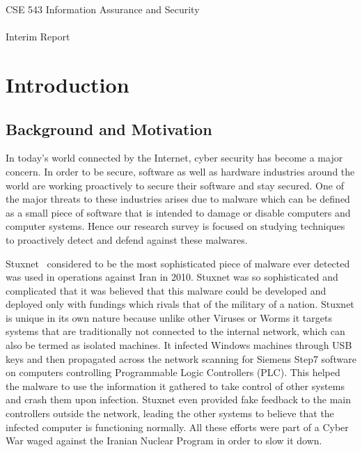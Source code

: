 \documentclass[11pt]{article}
\title{\fulltitle}
\author{Tejas Khairnar (1207690220, Group Leader) \\Sujay Vaishampayan (1209248166, Deputy Group Leader)\\  Zhibo Sun(1207644187)\\Harshil Maskai (1209174092)\\ Aloma Lopes (1209273126)\\ Chaitanya Palaka (1209261868)\\ Varun Chandrasekar (1209248010) \\ Kunal Bansal (1211213169) \\ Raj Dalvi (1209232176) \\ Vimal Vadivelu (1209203043)\\ \\
		Arizona State University}
\begin{document}
	\begingroup
		\fontsize{15pt}{15pt}\selectfont
		\begin{center}
			CSE 543 Information Assurance and Security \\~\\
			Interim Report
		\end{center}
	\endgroup
	\tableofcontents
	
	\section{Introduction}
	\subsection{Background and Motivation}
	In today’s world connected by the Internet, cyber security has become a major concern. In order
to be secure, software as well as hardware industries around the world are working proactively to
secure their software and stay secured. One of the major threats to these industries arises due to
malware which can be defined as a small piece of software that is intended to damage or disable
computers and computer systems. Hence our research survey is focused on studying techniques
to proactively detect and defend against these malwares.

Stuxnet~\cite{creators2013kill, stuxnet} considered to be the most sophisticated piece of malware ever detected was used in operations against Iran in 2010. Stuxnet was so sophisticated and complicated that it was believed that this malware could be developed and deployed only with fundings which rivals that of the military of a nation. Stuxnet is unique in its own nature because unlike other Viruses or Worms it targets systems that are traditionally not connected to the internal network, which can also be termed as isolated machines. It infected Windows machines through USB keys and then propagated across the network scanning for Siemens Step7 software on computers controlling Programmable Logic Controllers (PLC). This helped the malware to use the information it gathered to take control of other systems and crash them upon infection. Stuxnet even provided fake feedback to the main controllers outside the network, leading the other systems to believe that the infected computer is functioning normally. All these efforts were part of a Cyber War waged against the Iranian Nuclear Program in order to slow it down.
\end{document}
